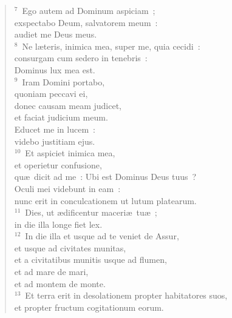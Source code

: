\begin{flushleft}\begin{verse}${}^{7}$~Ego autem ad Dominum aspiciam~;\\ exspectabo Deum, salvatorem meum~:\\ audiet me Deus meus.\\
${}^{8}$~Ne l\ae teris, inimica mea, super me, quia cecidi~:\\ consurgam cum sedero in tenebris~:\\ Dominus lux mea est.\\
${}^{9}$~Iram Domini portabo,\\ quoniam peccavi ei,\\ donec causam meam judicet,\\ et faciat judicium meum.\\ Educet me in lucem~:\\ videbo justitiam ejus.\\
${}^{10}$~Et aspiciet inimica mea,\\ et operietur confusione,\\ qu\ae\ dicit ad me~: Ubi est Dominus Deus tuus~?\\ Oculi mei videbunt in eam~:\\ nunc erit in conculcationem ut lutum platearum.\\
${}^{11}$~Dies, ut \ae dificentur maceri\ae\ tu\ae~;\\ in die illa longe fiet lex.\\
${}^{12}$~In die illa et usque ad te veniet de Assur,\\ et usque ad civitates munitas,\\ et a civitatibus munitis usque ad flumen,\\ et ad mare de mari,\\ et ad montem de monte.\\
${}^{13}$~Et terra erit in desolationem propter habitatores suos,\\ et propter fructum cogitationum eorum.\end{verse}\end{flushleft}


